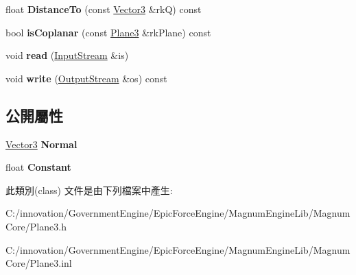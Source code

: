 \begin{DoxyCompactItemize}
\item 
float {\bfseries Distance\+To} (const \hyperlink{class_i_dream_sky_1_1_vector3}{Vector3} \&rkQ) const \hypertarget{class_i_dream_sky_1_1_plane3_a2753a72a6cac6ba5b12000879d7e0d09}{}\label{class_i_dream_sky_1_1_plane3_a2753a72a6cac6ba5b12000879d7e0d09}

\item 
bool {\bfseries is\+Coplanar} (const \hyperlink{class_i_dream_sky_1_1_plane3}{Plane3} \&rk\+Plane) const \hypertarget{class_i_dream_sky_1_1_plane3_a64739dcdc6aea42e689abceb251d18a9}{}\label{class_i_dream_sky_1_1_plane3_a64739dcdc6aea42e689abceb251d18a9}

\item 
void {\bfseries read} (\hyperlink{class_i_dream_sky_1_1_input_stream}{Input\+Stream} \&is)\hypertarget{class_i_dream_sky_1_1_plane3_a3734c722f25c6189fd649d23b715a4f9}{}\label{class_i_dream_sky_1_1_plane3_a3734c722f25c6189fd649d23b715a4f9}

\item 
void {\bfseries write} (\hyperlink{class_i_dream_sky_1_1_output_stream}{Output\+Stream} \&os) const \hypertarget{class_i_dream_sky_1_1_plane3_a81d4ab6d6c6633ea3662a92f36b1c208}{}\label{class_i_dream_sky_1_1_plane3_a81d4ab6d6c6633ea3662a92f36b1c208}

\end{DoxyCompactItemize}
\subsection*{公開屬性}
\begin{DoxyCompactItemize}
\item 
\hyperlink{class_i_dream_sky_1_1_vector3}{Vector3} {\bfseries Normal}\hypertarget{class_i_dream_sky_1_1_plane3_a2b90df770e3060e1203e94ccdf00bece}{}\label{class_i_dream_sky_1_1_plane3_a2b90df770e3060e1203e94ccdf00bece}

\item 
float {\bfseries Constant}\hypertarget{class_i_dream_sky_1_1_plane3_a2ef9d1112ac669e9839e765abaf0ca34}{}\label{class_i_dream_sky_1_1_plane3_a2ef9d1112ac669e9839e765abaf0ca34}

\end{DoxyCompactItemize}


此類別(class) 文件是由下列檔案中產生\+:\begin{DoxyCompactItemize}
\item 
C\+:/innovation/\+Government\+Engine/\+Epic\+Force\+Engine/\+Magnum\+Engine\+Lib/\+Magnum\+Core/Plane3.\+h\item 
C\+:/innovation/\+Government\+Engine/\+Epic\+Force\+Engine/\+Magnum\+Engine\+Lib/\+Magnum\+Core/Plane3.\+inl\end{DoxyCompactItemize}
